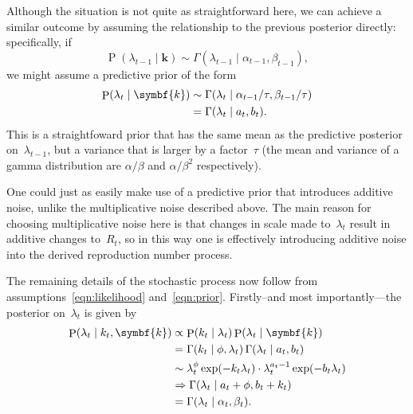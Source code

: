 \documentclass[12pt,a4paper]{article}
\newcommand\ub[1]{\symbf{#1}}                 %
\DeclareMathOperator\Pb{P}                    %
\DeclarePairedDelimiter\lr{\lparen}{\rparen}  %
\begin{document}
Although the situation is not quite as straightforward here, we can achieve a
similar outcome by assuming the relationship to the previous posterior directly:
specifically, if
\begin{equation*}
  \Pb(\lambda_{t-1} \mid \ub{k}) \sim
    \Gamma(\lambda_{t-1} \mid \alpha_{t-1}, \beta_{t-1}),
\end{equation*}
we might assume a predictive prior of the form
\begin{align}\label{eqn:prior}
  \Pb(\lambda_t \mid \ub{k}) &\sim
    \Gamma(\lambda_t \mid \alpha_{t-1}/\tau, \beta_{t-1}/\tau) \\
  &= \Gamma\lr*{\lambda_t \mid a_t, b_t}.
\end{align}
This is a straightfoward prior that has the same mean as the predictive
posterior on~$\lambda_{t-1}$, but a variance that is larger by a factor~$\tau$
(the mean and variance of a gamma distribution are $\alpha/\beta$ and
$\alpha/\beta^2$ respectively).

One could just as easily make use of a predictive prior that introduces additive
noise, unlike the multiplicative noise described above. The main reason for
choosing multiplicative noise here is that changes in scale made to~$\lambda_t$
result in additive changes to~$R_t$, so in this way one is effectively
introducing additive noise into the derived reproduction number process.

The remaining details of the stochastic process now follow from
assumptions~\eqref{eqn:likelihood} and~\eqref{eqn:prior}. Firstly--and most
importantly---the posterior on~$\lambda_t$ is given by
\begin{align*}
  \Pb(\lambda_t \mid k_t, \ub{k}) &\propto \Pb(k_t \mid \lambda_t)
    \Pb(\lambda_t \mid \ub{k}) \\
  &= \Gamma(k_t \mid \phi, \lambda_t)\, \Gamma\lr*{\lambda_t \mid a_t, b_t} \\
  &\sim \lambda_t^\phi \exp(-k_t\lambda_t) \cdot
    \lambda_t^{a_t-1} \exp\lr*{-b_t\lambda_t} \\
  &\Rightarrow \Gamma\lr*{\lambda_t \mid a_t + \phi, b_t + k_t} \\
  &= \Gamma(\lambda_t \mid \alpha_t, \beta_t).
\end{align*}
\end{document}

